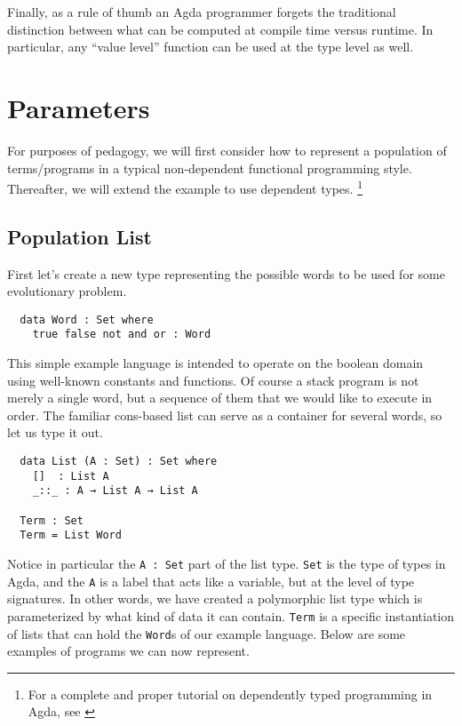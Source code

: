 \documentclass{acm_proc_article-sp}
\begin{document}
Finally, as a rule of thumb an Agda programmer forgets the traditional
distinction between what can be computed at compile time versus runtime. In
particular, any ``value level'' function can be used at the type level
as well.

\section{Parameters}

For purposes of pedagogy, we will first consider how to represent a
population of terms/programs in a typical non-dependent functional
programming style. Thereafter, we will extend the example to use
dependent types.
\footnote{For a complete and proper tutorial on dependently typed programming in Agda, see \cite{norell:agdatut}}

\subsection{Population List}

First let's create a new type representing the possible words to be
used for some evolutionary problem.

\begin{verbatim}
  data Word : Set where
    true false not and or : Word
\end{verbatim}

This simple example language is intended to operate on the boolean domain using
well-known constants and functions. Of course a stack program is not
merely a single word, but a sequence of them that we would like to
execute in order. The familiar cons-based list can serve as a
container for several words, so let us type it out.

\begin{verbatim}
  data List (A : Set) : Set where
    []  : List A
    _::_ : A → List A → List A

  Term : Set
  Term = List Word
\end{verbatim}

Notice in particular the \texttt{A : Set} part of the list
type. \texttt{Set} is the type of types in Agda, and the \texttt{A} is
a label that acts like a variable, but at the level of type
signatures. In other words, we have created a polymorphic list type
which is parameterized by what kind of data it can
contain. \texttt{Term} is a specific instantiation of lists that can
hold the \texttt{Word}s of our example language. Below are some
examples of programs we can now represent.
\end{document}
